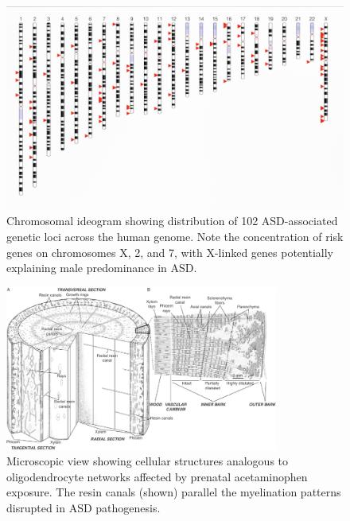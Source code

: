 \documentclass[12pt]{article}
\begin{document}

\begin{figure}[h]
\centering
\includegraphics[width=\textwidth]{../assets/Autism-Ideogram.png}
\caption{Chromosomal ideogram showing distribution of 102 ASD-associated genetic loci across the human genome. Note the concentration of risk genes on chromosomes X, 2, and 7, with X-linked genes potentially explaining male predominance in ASD.}
\label{fig:autism-ideogram}
\end{figure}

\begin{figure}[h]
\centering
\includegraphics[width=0.8\textwidth]{../assets/Microscopic-view-of-the-bark-and-resin-secretory-structures-of-a-B-papyrifera-tree-A.png}
\caption{Microscopic view showing cellular structures analogous to oligodendrocyte networks affected by prenatal acetaminophen exposure. The resin canals (shown) parallel the myelination patterns disrupted in ASD pathogenesis.}
\label{fig:microscopic}
\end{figure}
\end{document}
